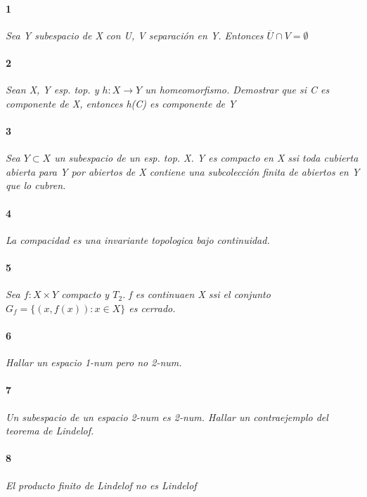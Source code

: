 \documentclass[12pt]{article}
\author{Alumnos: \\Arturo Rodriguez Contreras - 2132880 \\
Jonathan Raymundo Torres Cardenas - 1949731\\
Praxedis Jimenes Ruvalcaba \\
Erick Román Montemayor Treviño - 1957959 \\
Alexis Noe Mora Leyva \\
Everardo Flores Rivera - 2127301}
\begin{document}
\maketitle

\paragraph{1}
\textit{Sea Y subespacio de X con U, V separación en Y. Entonces $\overline{U}\cap V=\emptyset$}

\paragraph{2}
\textit{Sean X, Y esp. top. y $h:X\rightarrow Y$ un homeomorfismo. Demostrar que si C es componente de X, entonces h(C) es componente de Y}

\paragraph{3}
\textit{Sea $Y\subset X$ un subespacio de un esp. top. X. Y es compacto en X ssi toda cubierta abierta para Y por abiertos de X contiene una subcolección finita de abiertos en Y que lo cubren.}

\paragraph{4}
\textit{La compacidad es una invariante topologica bajo continuidad.}

\paragraph{5}
\textit{Sea $f:X\times Y$ compacto y $T_2$. f es continuaen X ssi el conjunto $G_f =\{(x,f(x)):x\in X\}$ es cerrado.}

\paragraph{6}
\textit{Hallar un espacio 1-num pero no 2-num.}

\paragraph{7}
\textit{Un subespacio de un espacio 2-num es 2-num. Hallar un contraejemplo del teorema de Lindelof.}

\paragraph{8}
\textit{El producto finito de Lindelof no es Lindelof}
\end{document}
